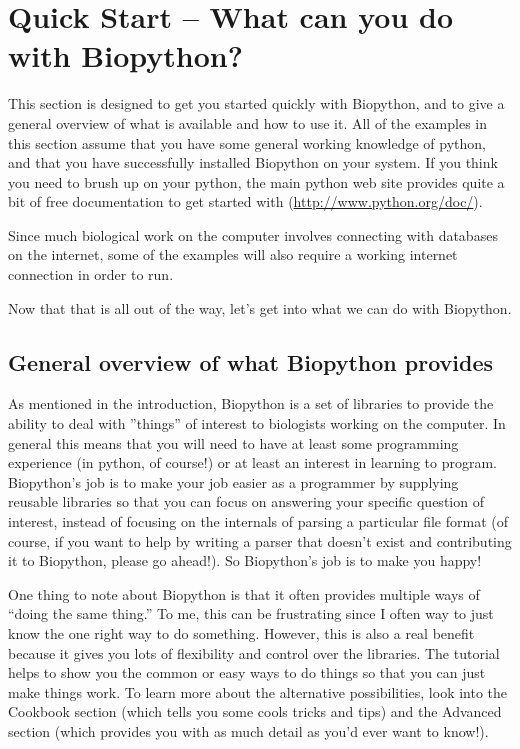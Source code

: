 \documentclass{report}
\begin{document}
\chapter{Quick Start -- What can you do with Biopython?}

This section is designed to get you started quickly with Biopython, and to give a general overview of what is available and how to use it. All of the examples in this section assume that you have some general working knowledge of python, and that you have successfully installed Biopython on your system. If you think you need to brush up on your python, the main python web site provides quite a bit of free documentation to get started with (\url{http://www.python.org/doc/}). 

 
Since much biological work on the computer involves connecting with databases on the internet, some of the examples will also require a working internet connection in order to run. 


Now that that is all out of the way, let's get into what we can do with Biopython.

\section{General overview of what Biopython provides}

As mentioned in the introduction, Biopython is a set of libraries to provide the ability to deal with ''things'' of interest to biologists working on the computer. In general this means that you will need to have at least some programming experience (in python, of course!) or at least an interest in learning to program. Biopython's job is to make your job easier as a programmer by supplying reusable libraries so that you can focus on answering your specific question of interest, instead of focusing on the internals of parsing a particular file format (of course, if you want to help by writing a parser that doesn't exist and contributing it to Biopython, please go ahead!). So Biopython's job is to make you happy!


One thing to note about Biopython is that it often provides multiple ways of ``doing the same thing.'' To me, this can be frustrating since I often way to just know the one right way to do something. However, this is also a real benefit because it gives you lots of flexibility and control over the libraries. The tutorial helps to show you the common or easy ways to do things so that you can just make things work. To learn more about the alternative possibilities, look into the Cookbook section (which tells you some cools tricks and tips) and the Advanced section (which provides you with as much detail as you'd ever want to know!). 
\end{document}
